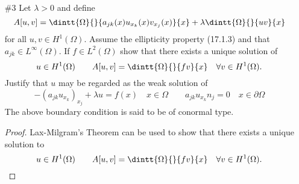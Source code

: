 \documentclass[11pt, oneside]{article}
\begin{document}
\begin{enumerate}
\begin{proof}
      Next I will show that $A$ is bounded.
      \begin{align*}
        A[u, v] &= 
      \end{align*}

      Finally I will show that $A$ is coercive.
      \begin{align*}
        A[u, u] &= 
      \end{align*}

      Now Lax-Milgram's Theorem states that there exists a unique solution to
      \[
        \dintt{\Omega}{}{\nabla u \nabla v + c(x) uv}{x} = \dintt{\Omega}{}{fv}{x}
      \]
      for all $v \in H^1_0(\Omega)$.
      This also implies that there is a weak solution to
      \[
        -\Delta u + c(x) u = f \quad x \in \Omega \qquad u = 0 \quad \forall x \in \partial \Omega
      \]
    \end{proof}

  \pagebreak
  \item[\#3]
    Let $\lambda > 0$ and define
    \[
      A[u, v] = \dintt{\Omega}{}{a_{jk}(x)u_{x_k}(x) v_{x_j}(x)}{x} + \lambda \dintt{\Omega}{}{uv}{x}
    \]
    for all $u, v \in H^1(\Omega)$.
    Assume the ellipticity property (17.1.3) and that $a_{jk} \in L^{\infty}(\Omega)$.
    If $f \in L^2(\Omega)$ show that there exists a unique solution of
    \[
      u \in H^1(\Omega) \qquad A[u, v] = \dintt{\Omega}{}{fv}{x} \quad \forall v \in H^1(\Omega).
    \]
    Justify that $u$ may be regarded as the weak solution of
    \[
      -(a_{jk}u_{x_k})_{x_j} + \lambda u = f(x) \quad x \in \Omega \qquad a_{jk}u_{x_k}n_j = 0 \quad x \in \partial \Omega
    \]
    The above boundary condition is said to be of conormal type.

    \begin{proof}
      Lax-Milgram's Theorem can be used to show that there exists a unique solution to
      \[
        u \in H^1(\Omega) \qquad A[u, v] = \dintt{\Omega}{}{fv}{x} \quad \forall v \in H^1(\Omega).
      \]


\end{proof}
\end{enumerate}
\end{document}
